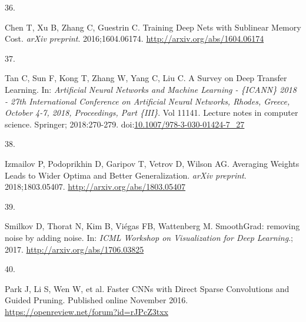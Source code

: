 \documentclass[
  12pt,
  a5,margin=2cmpaper,
]{article}
\newlength{\cslhangindent}
\newlength{\csllabelwidth}
\newlength{\cslentryspacingunit} %
\newenvironment{CSLReferences}[2] %
 {%
  \setlength{\parindent}{0pt}
  \ifodd #1
  \let\oldpar\par
  \def\par{\hangindent=\cslhangindent\oldpar}
  \fi
  \setlength{\parskip}{#2\cslentryspacingunit}
 }%
 {}
\newcommand{\CSLLeftMargin}[1]{\parbox[t]{\csllabelwidth}{#1}}
\newcommand{\CSLRightInline}[1]{\parbox[t]{\linewidth - \csllabelwidth}{#1}\break}
\begin{document}
\begin{CSLReferences}{0}{0}
\leavevmode{}%
\CSLLeftMargin{36. }%
\CSLRightInline{Chen T, Xu B, Zhang C, Guestrin C. {Training Deep Nets
with Sublinear Memory Cost}. \emph{arXiv preprint}. 2016;1604.06174.
\url{http://arxiv.org/abs/1604.06174}}

\leavevmode{}%
\CSLLeftMargin{37. }%
\CSLRightInline{Tan C, Sun F, Kong T, Zhang W, Yang C, Liu C. {A Survey
on Deep Transfer Learning}. In: \emph{Artificial Neural Networks and
Machine Learning - {\{}ICANN{\}} 2018 - 27th International Conference on
Artificial Neural Networks, Rhodes, Greece, October 4-7, 2018,
Proceedings, Part {\{}III{\}}}. Vol 11141. Lecture notes in computer
science. Springer; 2018:270-279.
doi:\href{https://doi.org/10.1007/978-3-030-01424-7_27}{10.1007/978-3-030-01424-7\_27}}

\leavevmode{}%
\CSLLeftMargin{38. }%
\CSLRightInline{Izmailov P, Podoprikhin D, Garipov T, Vetrov D, Wilson
AG. {Averaging Weights Leads to Wider Optima and Better Generalization}.
\emph{arXiv preprint}. 2018;1803.05407.
\url{http://arxiv.org/abs/1803.05407}}

\leavevmode{}%
\CSLLeftMargin{39. }%
\CSLRightInline{Smilkov D, Thorat N, Kim B, Viégas FB, Wattenberg M.
{SmoothGrad: removing noise by adding noise}. In: \emph{ICML Workshop on
Visualization for Deep Learning}.; 2017.
\url{http://arxiv.org/abs/1706.03825}}

\leavevmode{}%
\CSLLeftMargin{40. }%
\CSLRightInline{Park J, Li S, Wen W, et al. {Faster CNNs with Direct
Sparse Convolutions and Guided Pruning}. Published online November 2016.
\url{https://openreview.net/forum?id=rJPcZ3txx}}

\end{CSLReferences}
\end{document}
